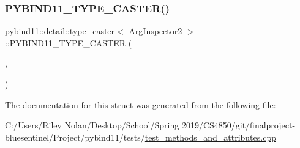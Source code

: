 \subsubsection{\texorpdfstring{PYBIND11\_TYPE\_CASTER()}{PYBIND11\_TYPE\_CASTER()}}
{\footnotesize\ttfamily pybind11\+::detail\+::type\+\_\+caster$<$ \mbox{\hyperlink{class_arg_inspector2}{Arg\+Inspector2}} $>$\+::P\+Y\+B\+I\+N\+D11\+\_\+\+T\+Y\+P\+E\+\_\+\+C\+A\+S\+T\+ER (\begin{DoxyParamCaption}\item[{\mbox{\hyperlink{class_arg_inspector2}{Arg\+Inspector2}}}]{,  }\item[{\mbox{\hyperlink{descr_8h_af114703e20c6527e87163eb2798f74b8}{\+\_\+}}(\char`\"{}Arg\+Inspector2\char`\"{})}]{ }\end{DoxyParamCaption})}



The documentation for this struct was generated from the following file\+:\begin{DoxyCompactItemize}
\item 
C\+:/\+Users/\+Riley Nolan/\+Desktop/\+School/\+Spring 2019/\+C\+S4850/git/finalproject-\/bluesentinel/\+Project/pybind11/tests/\mbox{\hyperlink{test__methods__and__attributes_8cpp}{test\+\_\+methods\+\_\+and\+\_\+attributes.\+cpp}}\end{DoxyCompactItemize}
